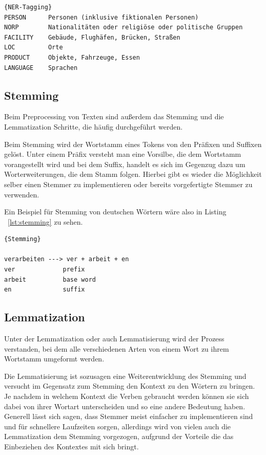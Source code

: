 \begin{lstlisting}[label={lst:ner-tagging},caption={Beispiele für Enitites}]{NER-Tagging}
PERSON      Personen (inklusive fiktionalen Personen)
NORP        Nationalitäten oder religiöse oder politische Gruppen
FACILITY    Gebäude, Flughäfen, Brücken, Straßen
LOC         Orte
PRODUCT     Objekte, Fahrzeuge, Essen
LANGUAGE    Sprachen
\end{lstlisting}

\subsection{Stemming}

Beim Preprocessing von Texten sind außerdem das Stemming und die Lemmatization Schritte, die häufig durchgeführt werden.

Beim Stemming wird der Wortstamm eines Tokens von den Präfixen und Suffixen gelöst.
Unter einem Präfix versteht man eine Vorsilbe, die dem Wortstamm vorangestellt wird und bei dem Suffix, handelt es sich im Gegenzug dazu um Worterweiterungen, die dem Stamm folgen.
Hierbei gibt es wieder die Möglichkeit selber einen Stemmer zu implementieren oder bereits vorgefertigte Stemmer zu verwenden.\cite{textAnalysisMonkeylearn, machineLearningTextAnalysis}

Ein Beispiel für Stemming von deutschen Wörtern wäre also in Listing ~\ref{lst:stemming} zu sehen.

\begin{lstlisting}[label={lst:stemming},caption={Stemming von deutschen Wörtern}]{Stemming}

verarbeiten ---> ver + arbeit + en
ver             prefix
arbeit          base word
en              suffix
\end{lstlisting}

\subsection{Lemmatization}

Unter der Lemmatization oder auch Lemmatisierung wird der Prozess verstanden, bei dem alle verschiedenen Arten von einem Wort zu ihrem Wortstamm umgeformt werden.

Die Lemmatisierung ist sozusagen eine Weiterentwicklung des Stemming und versucht im Gegensatz zum Stemming den Kontext zu den Wörtern zu bringen.
Je nachdem in welchem Kontext die Verben gebraucht werden können sie sich dabei von ihrer Wortart unterscheiden und so eine andere Bedeutung haben.
Generell lässt sich sagen, dass Stemmer meist einfacher zu implementieren sind und für schnellere Laufzeiten sorgen, allerdings wird von vielen auch die Lemmatization dem Stemming vorgezogen, aufgrund der Vorteile die das Einbeziehen des Kontextes mit sich bringt.\cite{machineLearningTextAnalysis, textAnalysisMonkeylearn, stemmingLemmatization}


